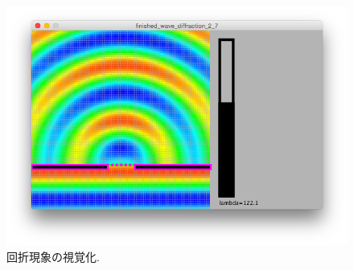 \begin{figure}[H]
 \begin{center}
  \includegraphics[width=120mm]{../result/diffractiondemo.png}
 \end{center}
 \caption{回折現象の視覚化.}
 \label{fig:diffractiondemo}
\end{figure}


